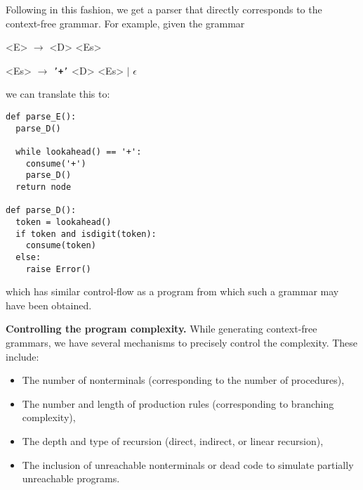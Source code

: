 \documentclass[conference,anonymous,review]{IEEEtran}
\def\term#1{\texttt{'\textbf{#1}'}}
\begin{document}
Following in this fashion, we get a parser that directly corresponds to the context-free
grammar. For example, given the grammar
\begin{grammar}\centering
  <E> $\rightarrow$ <D> <Es>\phantom{a}\phantom{a}\phantom{a}\phantom{a}\phantom{a}\phantom{a}\phantom{a}\phantom{a}

<Es> $\rightarrow$ \term{+} <D> <Es> $\mid$ $\epsilon$
\end{grammar}
we can translate this to:
\begin{lstlisting}[style=Python, escapechar=|,numbersep=2pt]
def parse_E():
  parse_D()

  while lookahead() == '+':
    consume('+')
    parse_D()
  return node

def parse_D():
  token = lookahead()
  if token and isdigit(token):
    consume(token)
  else:
    raise Error()
\end{lstlisting}
which has similar control-flow as a program from which such a grammar may have
been obtained.


% 
% 
% 
% 
% 
% 

\noindent\textbf{Controlling the program complexity.}
While generating context-free grammars, we have several mechanisms to
precisely control the complexity. These include:

\begin{itemize}
    \item The number of nonterminals (corresponding to the number of procedures),
    \item The number and length of production rules (corresponding to branching complexity),
    \item The depth and type of recursion (direct, indirect, or linear recursion),
    \item The inclusion of unreachable nonterminals or dead code to simulate partially unreachable programs.
\end{itemize}
\end{document}
